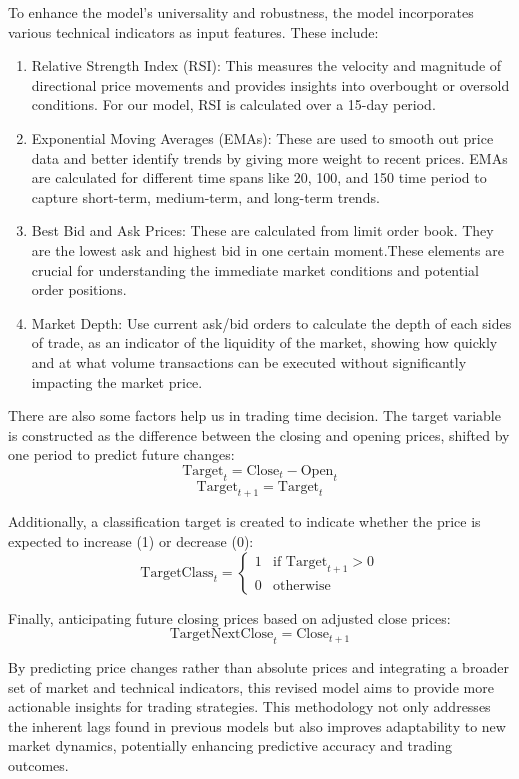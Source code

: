 \documentclass[conference]{IEEEtran}
\begin{document}
To enhance the model’s universality and robustness, the model incorporates various technical indicators as input features. These include:
\begin{enumerate}    
  \item Relative Strength Index (RSI): This measures the velocity and magnitude of directional price movements and provides insights into overbought or oversold conditions. For our model, RSI is calculated over a 15-day period.
  \item Exponential Moving Averages (EMAs): These are used to smooth out price data and better identify trends by giving more weight to recent prices. EMAs are calculated for different time spans like 20, 100, and 150 time period to capture short-term, medium-term, and long-term trends. 
  \item Best Bid and Ask Prices: These are calculated from limit order book. They are the lowest ask and highest bid in one certain moment.These elements are crucial for understanding the immediate market conditions and potential order positions. 
  \item Market Depth: Use current ask/bid orders to calculate the depth of each sides of trade, as an indicator of the liquidity of the market, showing how quickly and at what volume transactions can be executed without significantly impacting the market price.
\end{enumerate}

There are also some factors help us in trading time decision. The target variable is constructed as the difference between the closing and opening prices, shifted by one period to predict future changes:
\[ \text{Target}_t = \text{Close}_t - \text{Open}_t \]
\[ \text{Target}_{t+1} = \text{Target}_t \]

Additionally, a classification target is created to indicate whether the price is expected to increase (1) or decrease (0):
\[ \text{TargetClass}_t = 
   \begin{cases} 
   1 & \text{if } \text{Target}_{t+1} > 0 \\
   0 & \text{otherwise}
   \end{cases}
\]

Finally, anticipating future closing prices based on adjusted close prices:
\[ \text{TargetNextClose}_t = \text{Close}_{t+1} \]

By predicting price changes rather than absolute prices and integrating a broader set of market and technical indicators, this revised model aims to provide more actionable insights for trading strategies. This methodology not only addresses the inherent lags found in previous models but also improves adaptability to new market dynamics, potentially enhancing predictive accuracy and trading outcomes.
\end{document}
